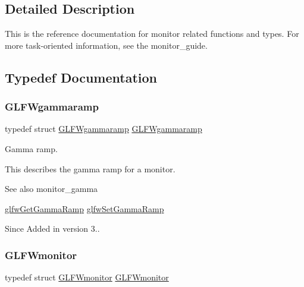 \subsection{Detailed Description}
This is the reference documentation for monitor related functions and types. For more task-\/oriented information, see the monitor\+\_\+guide. 

\subsection{Typedef Documentation}
\mbox{\label{group__monitor_gaec0bd37af673be8813592849f13e02f0}} 
\subsubsection{\texorpdfstring{G\+L\+F\+Wgammaramp}{GLFWgammaramp}}
{\footnotesize\ttfamily typedef struct \hyperlink{struct_g_l_f_wgammaramp}{G\+L\+F\+Wgammaramp}  \hyperlink{struct_g_l_f_wgammaramp}{G\+L\+F\+Wgammaramp}}



Gamma ramp. 

This describes the gamma ramp for a monitor.

\begin{DoxySeeAlso}{See also}
monitor\+\_\+gamma 

\hyperlink{group__monitor_gaeeac9198f3c91b83440eed679441f76b}{glfw\+Get\+Gamma\+Ramp} \hyperlink{group__monitor_gac9f36a1cfa10eab191d3029ea8bc9558}{glfw\+Set\+Gamma\+Ramp}
\end{DoxySeeAlso}
\begin{DoxySince}{Since}
Added in version 3.. 
\end{DoxySince}
\mbox{\label{group__monitor_ga8d9efd1cde9426692c73fe40437d0ae3}} 
\subsubsection{\texorpdfstring{G\+L\+F\+Wmonitor}{GLFWmonitor}}
{\footnotesize\ttfamily typedef struct \hyperlink{group__monitor_ga8d9efd1cde9426692c73fe40437d0ae3}{G\+L\+F\+Wmonitor} \hyperlink{group__monitor_ga8d9efd1cde9426692c73fe40437d0ae3}{G\+L\+F\+Wmonitor}}



